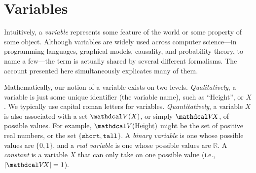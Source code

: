 %



\section{Variables}
    \label{ssec:basic-vars}
Intuitively, a \emph{variable} represents some feature of the world or some property of some object. 
Although variables are widely used across computer science---in programming languages, graphical models, causality, and probability theory, to name a few---the term is actually shared by several different formalisms. 
The account presented here simultaneously explicates many of them.

Mathematically, our notion of a variable exists on two levels.
\emph{Qualitatively}, a variable is just some unique identifier (the variable name), such as ``Height'', or $X$. 
We typically use capital roman letters for variables.
\emph{Quantitatively}, a variable $X$ is also associated with a set $\V(X)$, or simply $\V\!X$, of possible values. 
For example, $\V(\text{Height})$ might be the set of positive real numbers, 
    or the set $\{ \texttt{short}, \texttt{tall} \}$. 
A \emph{binary variable} is one whose possible values are $\{0, 1\}$, and a 
    \emph{real variable} is one whose possible values are $\mathbb R$. 
A \emph{constant} is a variable $X$ that can only take on one possible value (i.e., $|\V\! X| = 1$).

